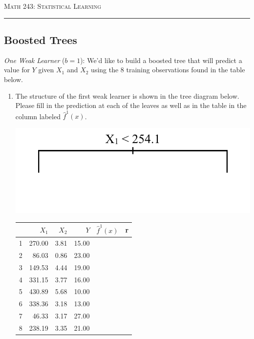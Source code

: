 \documentclass{article}\usepackage[]{graphicx}\usepackage[]{color}
\begin{document}
\begin{center}
\textsc{Math 243: Statistical Learning} \\
\noindent\rule{12cm}{0.4pt}
\end{center}

\subsection*{Boosted Trees}

\emph{One Weak Learner} ($b = 1$): We'd like to build a boosted tree that will predict a value for $Y$ given $X_1$ and $X_2$ using the 8 training observations found in the table below.

\begin{enumerate}
\item The structure of the first weak learner is shown in the tree diagram below. Please fill in the prediction at each of the leaves as well as in the table in the column labeled $\hat{f}^1(x)$.

\vspace{10mm}

\begin{minipage}[t]{.4\textwidth}
{\includegraphics[width=\textwidth]{treeA.png}}
\end{minipage}
\hfill
\begin{minipage}[t]{.4\textwidth}
\begin{tabular}{rrrrll}
  \hline
 & $X_1$ & $X_2$ & $Y$ & $\hat{f}^1(x)$ & r \\ 
  \hline
1 & 270.00 & 3.81 & 15.00 &  &  \\ 
  2 & 86.03 & 0.86 & 23.00 &  &  \\ 
  3 & 149.53 & 4.44 & 19.00 &  &  \\ 
  4 & 331.15 & 3.77 & 16.00 &  &  \\ 
  5 & 430.89 & 5.68 & 10.00 &  &  \\ 
  6 & 338.36 & 3.18 & 13.00 &  &  \\ 
  7 & 46.33 & 3.17 & 27.00 &  &  \\ 
  8 & 238.19 & 3.35 & 21.00 &  &  \\ 
   \hline
\end{tabular}


\end{minipage}
\end{enumerate}
\end{document}
